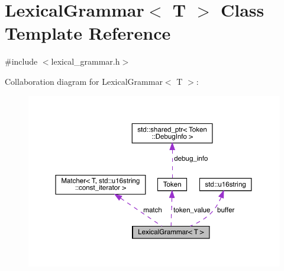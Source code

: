 \hypertarget{class_lexical_grammar}{}\section{Lexical\+Grammar$<$ T $>$ Class Template Reference}
\label{class_lexical_grammar}


{\ttfamily \#include $<$lexical\+\_\+grammar.\+h$>$}



Collaboration diagram for Lexical\+Grammar$<$ T $>$\+:\nopagebreak
\begin{figure}[H]
\begin{center}
\leavevmode
\includegraphics[width=350pt]{class_lexical_grammar__coll__graph}
\end{center}
\end{figure}
